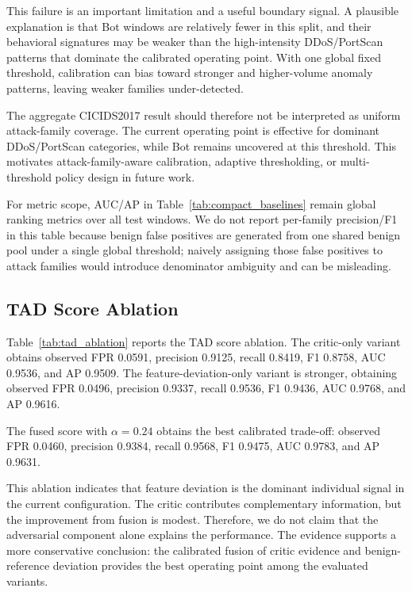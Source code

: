 This failure is an important limitation and a useful boundary signal. A plausible explanation is that Bot windows are relatively fewer in this split, and their behavioral signatures may be weaker than the high-intensity DDoS/PortScan patterns that dominate the calibrated operating point. With one global fixed threshold, calibration can bias toward stronger and higher-volume anomaly patterns, leaving weaker families under-detected.

The aggregate CICIDS2017 result should therefore not be interpreted as uniform attack-family coverage. The current operating point is effective for dominant DDoS/PortScan categories, while Bot remains uncovered at this threshold. This motivates attack-family-aware calibration, adaptive thresholding, or multi-threshold policy design in future work.

For metric scope, AUC/AP in Table~\ref{tab:compact_baselines} remain global ranking metrics over all test windows. We do not report per-family precision/F1 in this table because benign false positives are generated from one shared benign pool under a single global threshold; naively assigning those false positives to attack families would introduce denominator ambiguity and can be misleading.



\subsection{TAD Score Ablation}

Table~\ref{tab:tad_ablation} reports the TAD score ablation. The critic-only variant obtains observed FPR 0.0591, precision 0.9125, recall 0.8419, F1 0.8758, AUC 0.9536, and AP 0.9509. The feature-deviation-only variant is stronger, obtaining observed FPR 0.0496, precision 0.9337, recall 0.9536, F1 0.9436, AUC 0.9768, and AP 0.9616.

The fused score with $\alpha=0.24$ obtains the best calibrated trade-off: observed FPR 0.0460, precision 0.9384, recall 0.9568, F1 0.9475, AUC 0.9783, and AP 0.9631.

This ablation indicates that feature deviation is the dominant individual signal in the current configuration. The critic contributes complementary information, but the improvement from fusion is modest. Therefore, we do not claim that the adversarial component alone explains the performance. The evidence supports a more conservative conclusion: the calibrated fusion of critic evidence and benign-reference deviation provides the best operating point among the evaluated variants.

